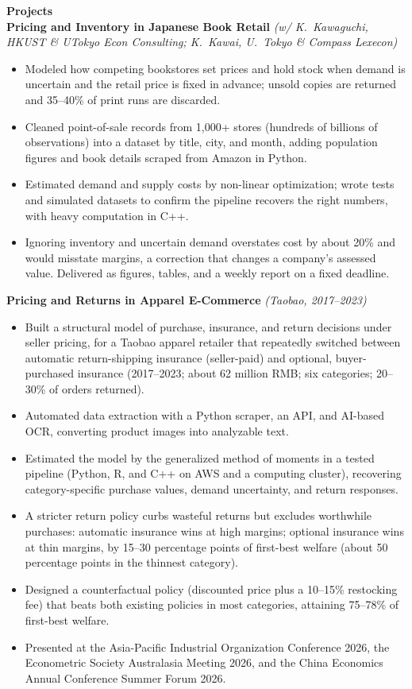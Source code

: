 \documentclass[11pt,letterpaper]{article}
\begin{document}
{\large \textbf{Projects}}\\[1pt]
\textbf{Pricing and Inventory in Japanese Book Retail} \textit{(w/ K.\ Kawaguchi, HKUST \& UTokyo Econ Consulting; K.\ Kawai, U.\ Tokyo \& Compass Lexecon)}\\
\vspace{1pt}
\begin{itemize}
  \item Modeled how competing bookstores set prices and hold stock when demand is uncertain and the retail price is fixed in advance; unsold copies are returned and 35--40\% of print runs are discarded.
  \item Cleaned point-of-sale records from 1{,}000+ stores (hundreds of billions of observations) into a dataset by title, city, and month, adding population figures and book details scraped from Amazon in Python.
  \item Estimated demand and supply costs by non-linear optimization; wrote tests and simulated datasets to confirm the pipeline recovers the right numbers, with heavy computation in C++.
  \item Ignoring inventory and uncertain demand overstates cost by about 20\% and would misstate margins, a correction that changes a company's assessed value. Delivered as figures, tables, and a weekly report on a fixed deadline.
\end{itemize}
\vspace{1pt}
\textbf{Pricing and Returns in Apparel E-Commerce} \textit{(Taobao, 2017--2023)}\\
\vspace{1pt}
\begin{itemize}
  \item Built a structural model of purchase, insurance, and return decisions under seller pricing, for a Taobao apparel retailer that repeatedly switched between automatic return-shipping insurance (seller-paid) and optional, buyer-purchased insurance (2017--2023; about 62 million RMB; six categories; 20--30\% of orders returned).
  \item Automated data extraction with a Python scraper, an API, and AI-based OCR, converting product images into analyzable text.
  \item Estimated the model by the generalized method of moments in a tested pipeline (Python, R, and C++ on AWS and a computing cluster), recovering category-specific purchase values, demand uncertainty, and return responses.
  \item A stricter return policy curbs wasteful returns but excludes worthwhile purchases: automatic insurance wins at high margins; optional insurance wins at thin margins, by 15--30 percentage points of first-best welfare (about 50 percentage points in the thinnest category).
  \item Designed a counterfactual policy (discounted price plus a 10--15\% restocking fee) that beats both existing policies in most categories, attaining 75--78\% of first-best welfare.
  \item Presented at the Asia-Pacific Industrial Organization Conference 2026, the Econometric Society Australasia Meeting 2026, and the China Economics Annual Conference Summer Forum 2026.
\end{itemize}
\end{document}
